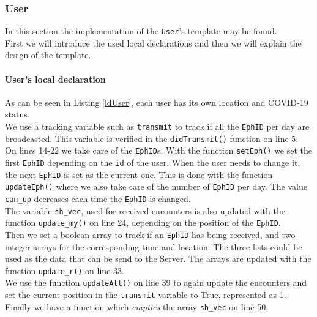 \documentclass[a4paper, twocolumn]{article}
\begin{document}
\subsubsection{User}
In this section the implementation of the \texttt{User}'s template may be found.\\
First we will introduce the used local declarations and then we will explain the design of the template.

\paragraph{User's local declaration}
As can be seen in Listing \ref{ldUser}, each user has its own location and COVID-19 status.\\
We use a tracking variable such as \texttt{transmit} to track if all the \texttt{EphID} per day are broadcasted. This variable is verified in the \texttt{didTransmit()} function on line 5.\\
On lines 14-22 we take care of the \texttt{EphID}s. With the function \texttt{setEph()} we set the first \texttt{EphID} depending on the \texttt{id} of the user. When the user needs to change it, the next \texttt{EphID} is set as the current one. This is done with the function \texttt{updateEph()} where we also take care of the number of \texttt{EphID} per day. The value \texttt{can\_up} decreases each time the \texttt{EphID} is changed.\\
The variable \texttt{sh\_vec}, used for received encounters is also updated with the function \texttt{update\_my()} on line 24, depending on the position of the \texttt{EphID}.\\
Then we set a boolean array to track if an \texttt{EphID} has being received, and two integer arrays for the corresponding time and location. The three lists could be used as the data that can be send to the Server. The arrays are updated with the function \texttt{update\_r()} on line 33.\\
We use the function \texttt{updateAll()} on line 39 to again update the encounters and set the current position in the \texttt{transmit} variable to True, represented as 1.\\
Finally we have a function which \textit{empties} the array \texttt{sh\_vec} on line 50.
\end{document}
